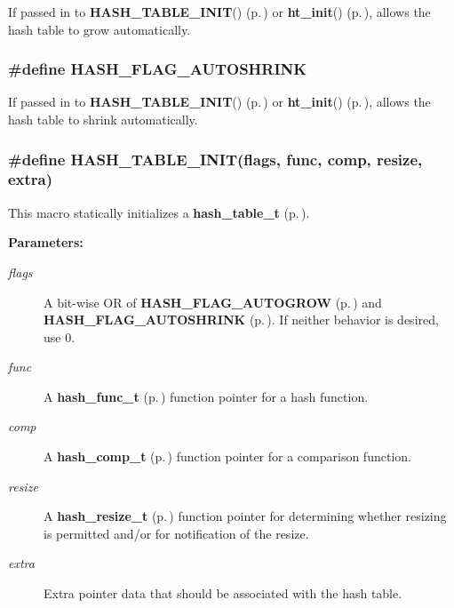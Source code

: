  If passed in to {\bf HASH\_\-TABLE\_\-INIT}() {\rm (p.\,\pageref{group__dbprim__hash_a18})} or {\bf ht\_\-init}() {\rm (p.\,\pageref{group__dbprim__hash_a6})}, allows the hash table to grow automatically. 
\subsubsection{\setlength{\rightskip}{0pt plus 5cm}\#define HASH\_\-FLAG\_\-AUTOSHRINK}\label{group__dbprim__hash_a17}




 If passed in to {\bf HASH\_\-TABLE\_\-INIT}() {\rm (p.\,\pageref{group__dbprim__hash_a18})} or {\bf ht\_\-init}() {\rm (p.\,\pageref{group__dbprim__hash_a6})}, allows the hash table to shrink automatically. 
\subsubsection{\setlength{\rightskip}{0pt plus 5cm}\#define HASH\_\-TABLE\_\-INIT(flags, func, comp, resize, extra)}\label{group__dbprim__hash_a18}




 This macro statically initializes a {\bf hash\_\-table\_\-t} {\rm (p.\,\pageref{group__dbprim__hash_a0})}.\begin{Desc}
\item[{\bf Parameters: }]\par
\begin{description}
\item[
{\em flags}]A bit-wise OR of {\bf HASH\_\-FLAG\_\-AUTOGROW} {\rm (p.\,\pageref{group__dbprim__hash_a16})} and {\bf HASH\_\-FLAG\_\-AUTOSHRINK} {\rm (p.\,\pageref{group__dbprim__hash_a17})}. If neither behavior is desired, use 0. \item[
{\em func}]A {\bf hash\_\-func\_\-t} {\rm (p.\,\pageref{group__dbprim__hash_a3})} function pointer for a hash function. \item[
{\em comp}]A {\bf hash\_\-comp\_\-t} {\rm (p.\,\pageref{group__dbprim__hash_a4})} function pointer for a comparison function. \item[
{\em resize}]A {\bf hash\_\-resize\_\-t} {\rm (p.\,\pageref{group__dbprim__hash_a5})} function pointer for determining whether resizing is permitted and/or for notification of the resize. \item[
{\em extra}]Extra pointer data that should be associated with the hash table. \end{description}
\end{Desc}
